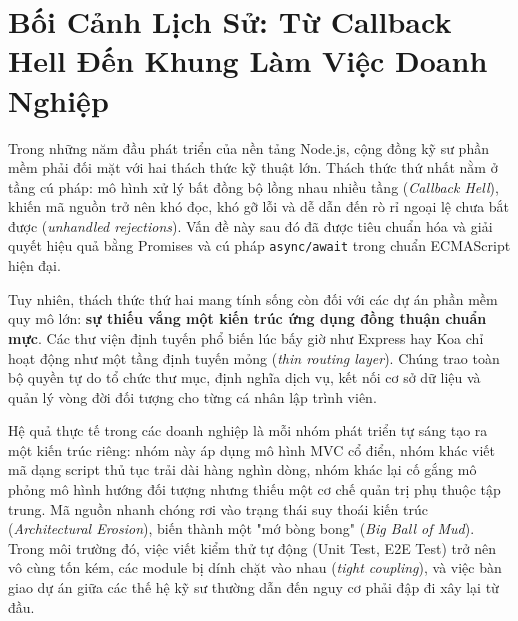 \documentclass[12pt,a4paper,oneside]{book}
\begin{document}
\section{Bối Cảnh Lịch Sử: Từ Callback Hell Đến Khung Làm Việc Doanh Nghiệp}
Trong những năm đầu phát triển của nền tảng Node.js, cộng đồng kỹ sư phần mềm phải đối mặt với hai thách thức kỹ thuật lớn. Thách thức thứ nhất nằm ở tầng cú pháp: mô hình xử lý bất đồng bộ lồng nhau nhiều tầng (\textit{Callback Hell}), khiến mã nguồn trở nên khó đọc, khó gỡ lỗi và dễ dẫn đến rò rỉ ngoại lệ chưa bắt được (\textit{unhandled rejections}). Vấn đề này sau đó đã được tiêu chuẩn hóa và giải quyết hiệu quả bằng Promises và cú pháp \texttt{async/await} trong chuẩn ECMAScript hiện đại.

Tuy nhiên, thách thức thứ hai mang tính sống còn đối với các dự án phần mềm quy mô lớn: \textbf{sự thiếu vắng một kiến trúc ứng dụng đồng thuận chuẩn mực}. Các thư viện định tuyến phổ biến lúc bấy giờ như Express hay Koa chỉ hoạt động như một tầng định tuyến mỏng (\textit{thin routing layer}). Chúng trao toàn bộ quyền tự do tổ chức thư mục, định nghĩa dịch vụ, kết nối cơ sở dữ liệu và quản lý vòng đời đối tượng cho từng cá nhân lập trình viên.

Hệ quả thực tế trong các doanh nghiệp là mỗi nhóm phát triển tự sáng tạo ra một kiến trúc riêng: nhóm này áp dụng mô hình MVC cổ điển, nhóm khác viết mã dạng script thủ tục trải dài hàng nghìn dòng, nhóm khác lại cố gắng mô phỏng mô hình hướng đối tượng nhưng thiếu một cơ chế quản trị phụ thuộc tập trung. Mã nguồn nhanh chóng rơi vào trạng thái suy thoái kiến trúc (\textit{Architectural Erosion}), biến thành một "mớ bòng bong" (\textit{Big Ball of Mud}). Trong môi trường đó, việc viết kiểm thử tự động (Unit Test, E2E Test) trở nên vô cùng tốn kém, các module bị dính chặt vào nhau (\textit{tight coupling}), và việc bàn giao dự án giữa các thế hệ kỹ sư thường dẫn đến nguy cơ phải đập đi xây lại từ đầu.
\end{document}
